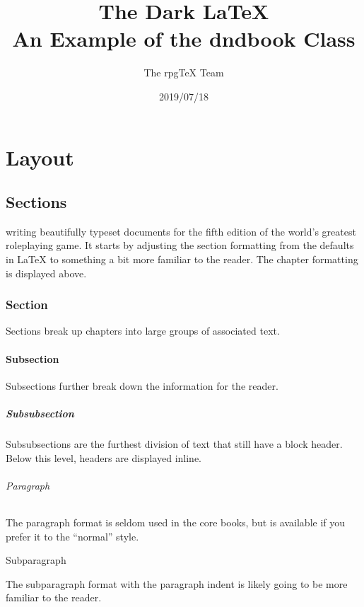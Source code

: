 \documentclass[letterpaper,twocolumn,openany,nodeprecatedcode]{dndbook}
\title{The Dark \LaTeX{} \\
\large An Example of the dndbook Class}
\author{The rpgTeX Team}
\date{2019/07/18}
\begin{document}
\frontmatter

\maketitle

\tableofcontents

\mainmatter%

\part{Layout}

\chapter{Sections}

 writing beautifully typeset documents for the fifth edition of the world's greatest roleplaying game. It starts by adjusting the section formatting from the defaults in \LaTeX{} to something a bit more familiar to the reader. The chapter formatting is displayed above.

\section{Section}
Sections break up chapters into large groups of associated text.

\subsection{Subsection}
Subsections further break down the information for the reader.

\subsubsection{Subsubsection}
Subsubsections are the furthest division of text that still have a block header. Below this level, headers are displayed inline.

\paragraph{Paragraph}
The paragraph format is seldom used in the core books, but is available if you prefer it to the ``normal'' style.

\subparagraph{Subparagraph}
The subparagraph format with the paragraph indent is likely going to be more familiar to the reader.
\end{document}
